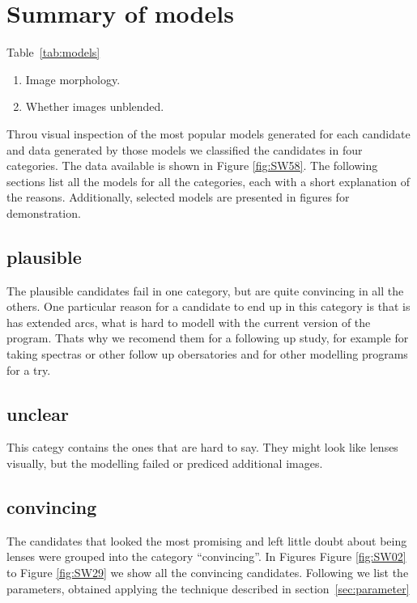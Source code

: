 \documentclass[fleqn,usenatbib]{mnras}
\newcommand{\figref}[1]{Figure \ref{fig:#1}}
\begin{document}
\section{Summary of models}

Table~\ref{tab:models} 

\begin{enumerate}
\item Image morphology.
\item Whether images unblended.
\end{enumerate}

Throu visual inspection of the most popular models generated for each candidate and data generated by those models we classified the candidates in four categories.
The data available is shown in \figref{SW58}.
The following sections list all the models for all the categories, each with a short explanation of the reasons.
Additionally, selected models are presented in figures for demonstration.

\subsection{plausible}

The plausible candidates fail in one category, but are quite convincing in all the others.
One particular reason for a candidate to end up in this category is that is has extended arcs, what is hard to modell with the current version of the program.
Thats why we recomend them for a following up study, for example for taking spectras or other follow up obersatories and for other modelling programs for a try.


\subsection{unclear}

This categy contains the ones that are hard to say.
They might look like lenses visually, but the modelling failed or prediced additional images.


\subsection{convincing}

The candidates that looked the most promising and left little doubt about being lenses were grouped into the category ``convincing''.
In Figures \figref{SW02} to \figref{SW29} we show all the convincing candidates.
Following we list the parameters, obtained applying the technique described in section~\ref{sec:parameter}
\end{document}
